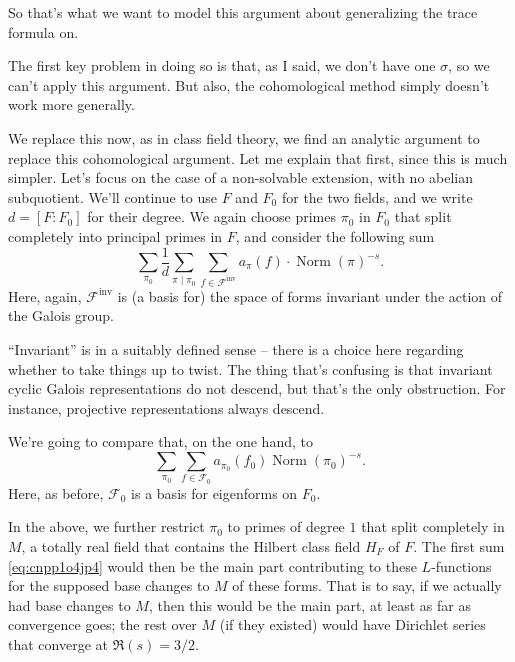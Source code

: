 \documentclass[reqno]{amsart} 
\begin{document}
So that's what we want to model this argument about generalizing the trace formula on.

The first key problem in doing so is that, as I said, we don't have one $\sigma$, so we can't apply this argument.  But also, the cohomological method simply doesn't work more generally.

We replace this now, as in class field theory, we find an analytic argument to replace this cohomological argument.  Let me explain that first, since this is much simpler.  Let's focus on the case of a non-solvable extension, with no abelian subquotient.  We'll continue to use $F$ and $F_0$ for the two fields, and we write $d =[F : F_0]$ for their degree.  We again choose primes $\pi_0$ in $F_0$ that split completely into principal primes in $F$, and consider the following sum
\begin{equation}\label{eq:cnpp1o4jp4}
  \sum_{\pi_0} \frac{1}{d}
  \sum_{\pi \mid \pi_0}
  \sum_{f \in \mathcal{F}^{\mathrm{inv}}}
  a_\pi(f) \cdot \operatorname{Norm}(\pi)^{- s}.
\end{equation}
Here, again, $\mathcal{F} ^{\mathrm{inv}}$ is (a basis for) the space of forms invariant under the action of the Galois group.

\begin{remark}
  ``Invariant'' is in a suitably defined sense -- there is a choice here regarding whether to take things up to twist.  The thing that's confusing is that invariant cyclic Galois representations do not descend, but that's the only obstruction.  For instance, projective representations always descend.
\end{remark}

We're going to compare that, on the one hand, to
\begin{equation}\label{eq:cnpp1pcyts}
  \sum_{\pi_0} \sum_{f \in \mathcal{F}_0}
  a_{\pi_0}(f_0)
  \operatorname{Norm}(\pi_0)^{- s}.
\end{equation}
Here, as before, $\mathcal{F}_0$ is a basis for eigenforms on $F_0$.

In the above, we further restrict $\pi_0$ to primes of degree $1$ that split completely in $M$, a totally real field that contains the Hilbert class field $H_F$ of $F$.  The first sum \eqref{eq:cnpp1o4jp4} would then be the main part contributing to these $L$-functions for the supposed base changes to $M$ of these forms.  That is to say, if we actually had base changes to $M$, then this would be the main part, at least as far as convergence goes; the rest over $M$ (if they existed) would have Dirichlet series that converge at $\Re(s) = 3/2$.
\end{document}
